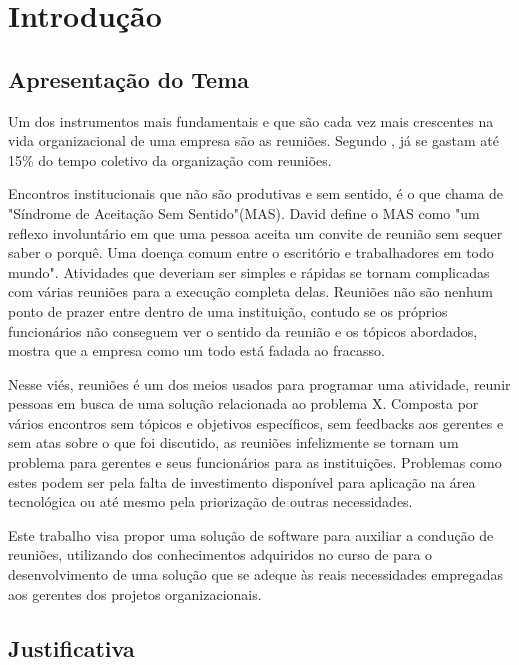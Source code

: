 \chapter[Introdução]{Introdução}
\label{cp:introducao}

\section{Apresentação do Tema}
\label{sec:apresentacao}

Um dos instrumentos mais fundamentais e que são cada vez mais crescentes na vida organizacional de uma empresa são as reuniões. Segundo \cite{allen2016}, já se gastam até 15\% do tempo coletivo da organização com reuniões. 

Encontros institucionais que não são produtivas e sem sentido, é o que \cite{davidgrady} chama de "Síndrome de Aceitação Sem Sentido"(MAS). David define o MAS como "um reflexo involuntário em que uma pessoa aceita um convite de reunião sem sequer saber o porquê. Uma doença comum entre o escritório e trabalhadores em todo mundo". Atividades que deveriam ser simples e rápidas se tornam complicadas com várias reuniões para a execução completa delas. Reuniões não são nenhum ponto de prazer entre dentro de uma instituição, contudo se os próprios funcionários não conseguem ver o sentido da reunião e os tópicos abordados, mostra que a empresa como um todo está fadada ao fracasso. 

Nesse viés, reuniões é um dos meios usados para programar uma atividade, reunir pessoas em busca de uma solução relacionada ao problema X. Composta por vários encontros sem tópicos e objetivos específicos, sem feedbacks aos gerentes e sem atas sobre o que foi discutido, as reuniões infelizmente se tornam um problema para gerentes e seus funcionários para as instituições. Problemas como estes podem ser pela falta de investimento disponível para aplicação na área tecnológica ou até mesmo pela priorização de outras necessidades.

Este trabalho visa propor uma solução de software para auxiliar a condução de reuniões, utilizando dos conhecimentos adquiridos no curso de \imprimircurso para o desenvolvimento de uma solução que se adeque às reais necessidades empregadas aos gerentes dos projetos organizacionais. 

\section{Justificativa}
\label{sec:justificativa}

